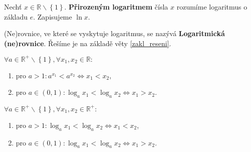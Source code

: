 \begin{definition}
    Nechť $x \in \mathbb R\smallsetminus\left \{ 1 \right \}. $ \textbf{Přirozeným logaritmem} čísla $x$
    rozumíme logaritmus o základu $e$. Zapisujeme $\ln x.$
\end{definition}

\begin{definition}
    (Ne)rovnice, ve které se vyskytuje logaritmus, se nazývá \textbf{Logaritmická (ne)rovnice}.
    Řešíme je na základě věty \ref{zakl_reseni}.
\end{definition}

\begin{veta}
    $\forall a \in \mathbb R^+ \smallsetminus \left \{ 1 \right \} , \forall x_1, x_2
    \in \mathbb R:$
    \begin{enumerate}[$i.$]
        \item pro $a>1:a^{x_1}<a^{x_2}\iff x_1 < x_2,$
       	\item pro $a \in (0,1): \log_a x_1 < \log_a x_2 \iff x_1 > x_2.$
    \end{enumerate}
\end{veta}

\begin{veta}
    $\forall a \in \mathbb R^+ \smallsetminus \left \{ 1 \right \} , \forall x_1, x_2
    \in \mathbb R^+:$
    \begin{enumerate}[$i.$]
        \item pro $a>1:\log_a x_1 < \log_a x_2 \iff x_1 < x_2$,
       	\item pro $a\in (0,1): \log_a x_1 < \log_a x_2 \iff x_1 > x_2.$
    \end{enumerate}
\end{veta}
